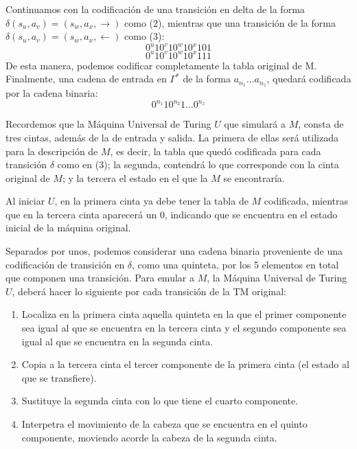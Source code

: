 \documentclass[12pt]{article}
\begin{document}
Continuamos con la codificación de una transición en delta de la forma $\delta(s_u,a_v) = (s_w,a_x,\rightarrow)$ como (2),
mientras que una transición de la forma $\delta(s_u,a_v) = (s_w,a_x,\leftarrow)$ como (3):\\
\begin{equation}
  0^u10^v10^w10^x101
\end{equation}
\begin{equation}
  0^u10^v10^w10^x111  
\end{equation}
De esta manera, podemos codificar completamente la tabla original de M.\\
Finalmente, una cadena de entrada en $\Gamma^*$ de la forma $a_{n_1} \dots a_{n_z}$, quedará codificada por la cadena binaria:\\
\begin{equation}
0^{n_1}10^{n_2}1\dots0^{n_z}
\end{equation}

Recordemos que la Máquina Universal de Turing $U$ que simulará a $M$, consta de tres cintas, además de la de entrada y salida. La primera de ellas
será utilizada para la descripción de $M$, es decir, la tabla que quedó codificada para cada transición $\delta$ como en (3); la segunda, contendrá lo que corresponde con la cinta original de $M$; y la tercera el estado en el que la $M$ se encontraría.

Al iniciar $U$, en la primera cinta ya debe tener la tabla de $M$ codificada, mientras que en la tercera cinta aparecerá un 0, indicando que se encuentra en el estado inicial de la máquina original.

Separados por unos, podemos considerar una cadena binaria proveniente de una codificación de transición en $\delta$, como una quinteta, por los 5 elementos en total que componen una transición. Para emular a $M$, la Máquina Universal de Turing $U$, deberá hacer lo siguiente por cada
transición de la TM original:\\
\begin{enumerate}
\item Localiza en la primera cinta aquella quinteta en la que el primer componente sea igual al que se encuentra en la tercera cinta y el segundo
  componente sea igual al que se encuentra en la segunda cinta.
\item Copia a la tercera cinta el tercer componente de la primera cinta (el estado al que se transfiere).
\item Sustituye la segunda cinta con lo que tiene el cuarto componente.
\item Interpetra el movimiento de la cabeza que se encuentra en el quinto componente, moviendo acorde la cabeza de la segunda cinta. 
\end{enumerate}
\end{document}
